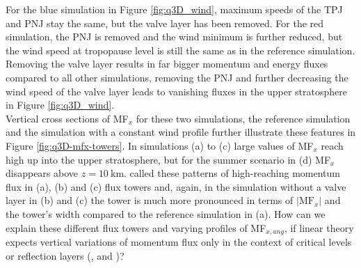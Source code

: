 For the blue simulation in Figure \ref{fig:q3D_wind}, maximum speeds of the TPJ and PNJ stay the same, but the valve layer has been removed. For the red simulation, the PNJ is removed and the wind minimum is further reduced, but the wind speed at tropopause level is still the same as in the reference simulation. Removing the valve layer results in far bigger momentum and energy fluxes compared to all other simulations, removing the PNJ and further decreasing the wind speed of the valve layer leads to vanishing fluxes in the upper stratosphere in Figure \ref{fig:q3D_wind}.\\
Vertical cross sections of MF$_x$ for these two simulations, the reference simulation and the simulation with a constant wind profile further illustrate these features in Figure \ref{fig:q3D-mfx-towers}. In simulations (a) to (c) large values of MF$_x$ reach high up into the upper stratosphere, but for the summer scenario in (d) MF$_x$ disappears above $z=\SI{10}{\kilo\meter}$. \textcite[]{kruse_gravity_2015} called these patterns of high-reaching momentum flux in (a), (b) and (c) flux towers and, again, in the simulation without a valve layer in (b) and (c) the tower is much more pronounced in terms of $\lvert \mathrm{MF}_x \rvert$ and the tower's width compared to the reference simulation in (a). How can we explain these different flux towers and varying profiles of MF$_{x,ang}$, if linear theory expects vertical variations of momentum flux only in the context of critical levels or reflection layers (\cite[]{booker_critical_1967}, \cite[]{jones_propagation_1967} and \cite[]{broad_linear_1995})?

